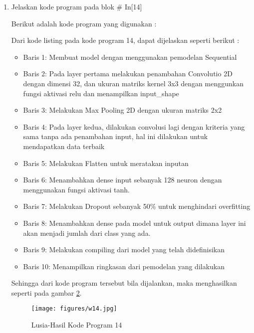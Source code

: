 \begin{enumerate}
\begin{itemize}
	\item Baris 16	: Melakukan fit atau compile 
	\item Baris 17	: Melakukan scoring dengan .evaluate yang berfungsi menampilkan data loss dan accuracy dari model
	\item Baris 18	: end merupakan variabel untuk melihat waktu akhir pada saat pemodelan berhasil dilakukan.
	\item Baris 19	: Menampilkan hasil dari run skrip
	\end{itemize}
	\par Sehingga dari kode program tersebut bila dijalankan, maka menghasilkan seperti pada gambar \ref{7B13}.
		\begin{figure}[!hbtp]
		\centering
		\texttt{[image: figures/w13.jpg]}
		\caption{Lusia-Hasil Kode Program 13}
		\label{7B13}
		\end{figure}

\item Jelaskan kode program pada blok \# In[14]
	\par Berikut adalah kode program yang digunakan :
	
	\par Dari kode listing pada kode program 14, dapat dijelaskan seperti berikut :
	\begin{itemize}
	\item Baris 1: Membuat model dengan menggunakan pemodelan Sequential
	\item Baris 2: Pada layer pertama melakukan penambahan Convolutio 2D dengan dimensi 32, dan ukuran matriks kernel 3x3 dengan menggunkan fungsi aktivasi relu dan menampilkan input\_shape
	\item Baris 3: Melakukan Max Pooling 2D dengan ukuran matriks 2x2
	\item Baris 4: Pada layer kedua, dilakukan convolusi lagi dengan kriteria yang sama tanpa ada penambahan input, hal ini dilakukan untuk mendapatkan data terbaik
	\item Baris 5: Melakukan Flatten untuk meratakan inputan
	\item Baris 6: Menambahkan dense input sebanyak 128 neuron dengan menggunakan fungsi aktivasi tanh.
	\item Baris 7: Melakukan Dropout sebanyak 50\% untuk menghindari overfitting
	\item Baris 8: Menambahkan dense pada model untuk output dimana layer ini akan menjadi jumlah dari class yang ada.
	\item Baris 9: Melakukan compiling dari model yang telah didefinisikan 
	\item Baris 10: Menampilkan ringkasan dari pemodelan yang dilakukan 
	\end{itemize}
	\par Sehingga dari kode program tersebut bila dijalankan, maka menghasilkan seperti pada gambar \ref{7B14}.
		\begin{figure}[!hbtp]
		\centering
		\texttt{[image: figures/w14.jpg]}
		\caption{Lusia-Hasil Kode Program 14}
		\label{7B14}
		\end{figure}


\end{enumerate}
